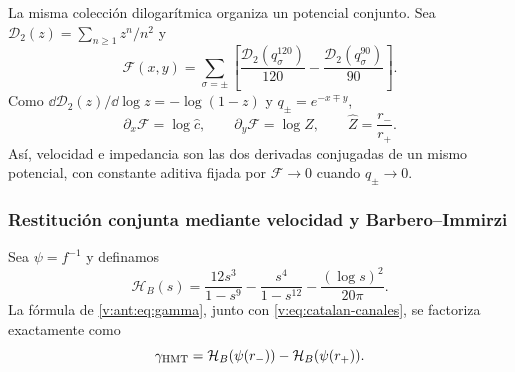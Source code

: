 La misma colección dilogarítmica organiza un potencial conjunto. Sea
$\mathcal D_2(z)=\sum_{n\geq1}z^n/n^2$ y
\begin{equation}
 \mathscr F(x,y)=\sum_{\sigma=\pm}
 \left[
 \frac{\mathcal D_2(q_\sigma^{120})}{120}
 -\frac{\mathcal D_2(q_\sigma^{90})}{90}
 \right].
 \label{v:eq:potencial-constitutivo-catalan}
\end{equation}
Como $\dd\mathcal D_2(z)/\dd\log z=-\log(1-z)$ y
$q_\pm=e^{-x\mp y}$,
\begin{equation}
 \partial_x\mathscr F=\log\widehat c,
 \qquad
 \partial_y\mathscr F=\log\widehat Z,
 \qquad \widehat Z=\frac{r_-}{r_+}.
 \label{v:eq:gradiente-constitutivo-catalan}
\end{equation}
Así, velocidad e impedancia son las dos derivadas conjugadas de un mismo
potencial, con constante aditiva fijada por $\mathscr F\to0$ cuando
$q_\pm\to0$.

\subsubsection{Restitución conjunta mediante velocidad y Barbero--Immirzi}

Sea $\psi=f^{-1}$ y definamos
\begin{equation}
 \mathcal H_B(s)=\frac{12s^3}{1-s^9}
 -\frac{s^4}{1-s^{12}}-\frac{(\log s)^2}{20\pi}.
 \label{v:eq:funcional-barbero-espectral}
\end{equation}
La fórmula de \eqref{v:ant:eq:gamma}, junto con
\eqref{v:eq:catalan-canales}, se factoriza exactamente como
\begin{equation}
 \gamma_{\mathrm{HMT}}=\mathcal H_B(\psi(r_-))
 -\mathcal H_B(\psi(r_+)).
 \label{v:eq:factorizacion-barbero-espectral}
\end{equation}

